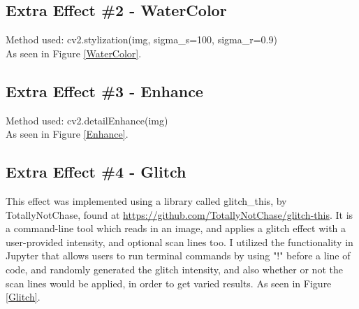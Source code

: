 \documentclass[a4paper,twoside,10pt, twocolumn]{report}
\begin{document}
	
	\subsection{Extra Effect \#2 - WaterColor}
	Method used: cv2.stylization(img, sigma\_s=100, sigma\_r=0.9)\\
	As seen in Figure \ref{WaterColor}.
	\subsection{Extra Effect \#3 - Enhance}
	Method used: cv2.detailEnhance(img)\\
	As seen in Figure \ref{Enhance}.
	\subsection{Extra Effect \#4 - Glitch}
	This effect was implemented using a library called glitch\_this, by TotallyNotChase, found at \url{https://github.com/TotallyNotChase/glitch-this}. It is a command-line tool which reads in an image, and applies a glitch effect with a user-provided intensity, and optional scan lines too. I utilized the functionality in Jupyter that allows users to run terminal commands by using "!" before a line of code, and randomly generated the glitch intensity, and also whether or not the scan lines would be applied, in order to get varied results.
	As seen in Figure \ref{Glitch}.
	
\end{document}
